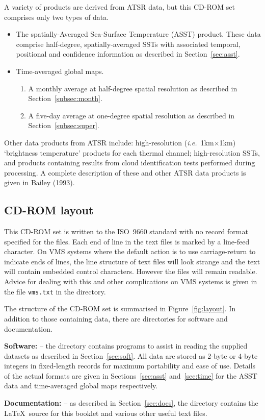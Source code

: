 A variety of products are derived from ATSR data, but this CD-ROM set 
comprises only two types of data.
\begin{itemize}
\item The spatially-Averaged Sea-Surface Temperature (ASST) product.
These data comprise half-degree, spatially-averaged SSTs 
with associated temporal, positional  and confidence 
information as described in Section~\ref{sec:asst}.

\item Time-averaged global maps.
\begin{enumerate} 
\item A monthly average at half-degree spatial resolution as 
described in Section~\ref{subsec:month}.
\item A five-day average at one-degree spatial resolution as 
described in Section~\ref{subsec:super}.
\end {enumerate}
\end {itemize}


Other data products from ATSR include: high-resolution 
({\sl i.e.\ }1km$\times$1km\/) `brightness temperature' products 
for each thermal channel; 
high-resolution SSTs, and  products containing results 
from cloud identification tests performed during processing.
A complete description of these and other ATSR data products 
is given in Bailey (1993).

\subsection{CD-ROM layout}
\label{subsec:layout}


This CD-ROM set is written to the ISO~9660 standard with no record format
specified for the files.
Each end of line in the text files is marked by a line-feed character.
On VMS systems where the default action is to use carriage-return 
to indicate ends of lines,  the line structure of text files will look strange 
and the text will contain embedded control characters. 
However the files will remain readable.
Advice for dealing with this and other complications on VMS systems is 
given in the file {\tt vms.txt} in the  directory.

The structure of the CD-ROM set is summarised in Figure~\ref{fig:layout}.
In addition to those containing data, there are directories for software
and documentation.

\begin{description}
\item{\bf Software:} -- the  directory 
contains programs to assist in reading the supplied datasets
as described in Section~\ref{sec:soft}.
All data are stored as 2-byte or 4-byte integers
in fixed-length records for maximum portability and ease of use.
Details of the actual formats are given in Sections~\ref{sec:asst}
and~\ref{sec:time} for the ASST data and time-averaged global maps respectively.
\item{\bf Documentation:} --
as described in Section~\ref{sec:docs},
the  directory contains the \LaTeX\ source 
for this booklet and various other useful text files.
\end{description}

